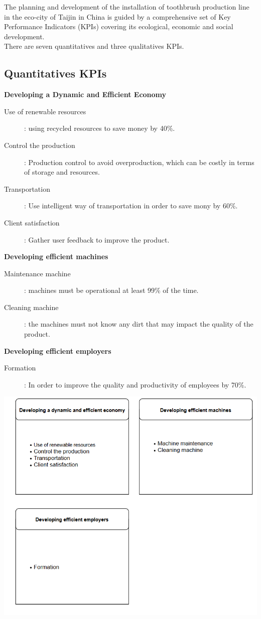 The planning and development of the installation of toothbrush production line in the eco-city of Taijin in China is guided by a comprehensive set of Key Performance Indicators (KPIs) covering its ecological, economic and social development.\\

There are seven quantitatives and three qualitatives KPIs.

\subsection{Quantitatives KPIs}

\textbf{Developing a Dynamic and Efficient Economy}
\begin{description}
    \item[Use of renewable resources]: using recycled resources to save money by 40\%.
    \item[Control the production]: Production control to avoid overproduction, which can be costly in terms of storage and resources.
    \item[Transportation]: Use intelligent way of transportation in order to save mony by 60\%.
    \item[Client satisfaction]: Gather user feedback to improve the product.
\end{description}

\textbf{Developing efficient machines}
\begin{description}
    \item[Maintenance machine]: machines must be operational at least 99\% of the time.
    \item[Cleaning machine]: the machines must not know any dirt that may impact the quality of the product.
\end{description}

\textbf{Developing efficient employers}
\begin{description}
    \item[Formation]: In order to improve the quality and productivity of employees by 70\%.
\end{description}

\includegraphics{Img/tableaudebord.png}

